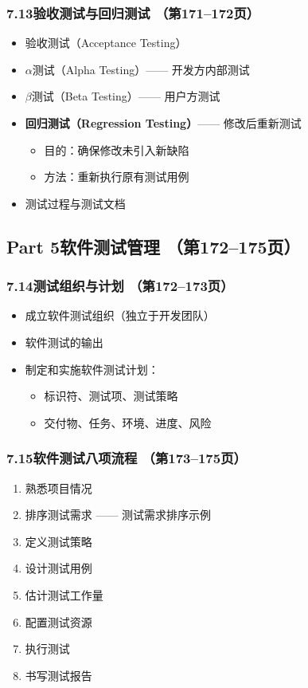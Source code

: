 \documentclass[12pt,a4paper]{ctexart}
\begin{document}
\subsubsection{7.13\quad 验收测试与回归测试 \hfill（第171--172页）}
\begin{itemize}
    \item 验收测试（Acceptance Testing）
    \item $\alpha$测试（Alpha Testing）—— 开发方内部测试
    \item $\beta$测试（Beta Testing）—— 用户方测试
    \item \textbf{回归测试（Regression Testing）}—— 修改后重新测试
    \begin{itemize}
        \item 目的：确保修改未引入新缺陷
        \item 方法：重新执行原有测试用例
    \end{itemize}
    \item 测试过程与测试文档
\end{itemize}

\subsection{Part 5\quad 软件测试管理 \hfill（第172--175页）}

\subsubsection{7.14\quad 测试组织与计划 \hfill（第172--173页）}
\begin{itemize}
    \item 成立软件测试组织（独立于开发团队）
    \item 软件测试的输出
    \item 制定和实施软件测试计划：
    \begin{itemize}
        \item 标识符、测试项、测试策略
        \item 交付物、任务、环境、进度、风险
    \end{itemize}
\end{itemize}

\subsubsection{7.15\quad 软件测试八项流程 \hfill（第173--175页）}
\begin{enumerate}
    \item 熟悉项目情况
    \item 排序测试需求 —— 测试需求排序示例
    \item 定义测试策略
    \item 设计测试用例
    \item 估计测试工作量
    \item 配置测试资源
    \item 执行测试
    \item 书写测试报告
\end{enumerate}
\end{document}
